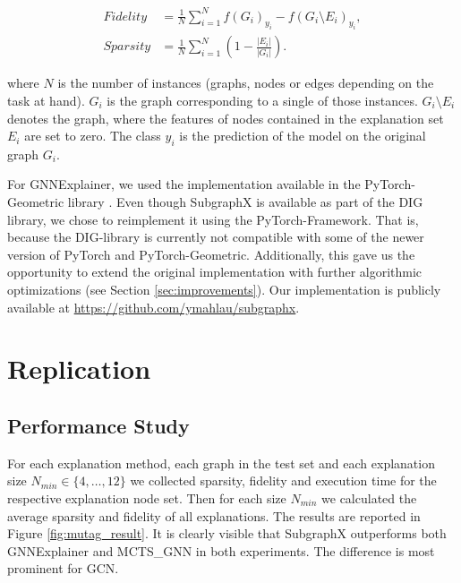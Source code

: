 \begin{align}
\mathit{Fidelity} &= \frac{1}{N} \sum_{i=1}^{N} f(G_i)_{y_i} - f(G_i \setminus E_i)_{y_i}, \\
\mathit{Sparsity} &= \frac{1}{N} \sum_{i=1}^{N} (1 - \frac{|E_i|}{|G_i|}).
\end{align}

where $N$ is the number of instances (graphs, nodes or edges depending on the task at hand). 
$G_i$ is the graph corresponding to a single of those instances. 
$G_i \setminus E_i$ denotes the graph, where the features of nodes contained in the explanation set $E_i$ are set to zero.
The class $y_i$ is the prediction of the model on the original graph $G_i$.

For GNNExplainer, we used the implementation available in the PyTorch-Geometric library \cite{fey19}. 
Even though SubgraphX is available as part of the DIG library, we chose to reimplement it using the PyTorch-Framework. 
That is, because the DIG-library is currently not compatible with some of the newer version of PyTorch and PyTorch-Geometric. 
Additionally, this gave us the opportunity to extend the original implementation with further algorithmic optimizations (see Section \ref{sec:improvements}). 
Our implementation is publicly available at \url{https://github.com/ymahlau/subgraphx}.




\section{Replication}
\label{sec:replication}
\subsection{Performance Study}
For each explanation method, each graph in the test set and each explanation size $N_{min} \in \{4,\dots,12\}$  we collected sparsity, fidelity and execution time for the respective explanation node set.
Then for each size $N_{min}$ we calculated the average sparsity and fidelity of all explanations. 
The results are reported in Figure \ref{fig:mutag_result}. 
It is clearly visible that SubgraphX outperforms both GNNExplainer and MCTS\_GNN in both experiments. 
The difference is most prominent for GCN.

